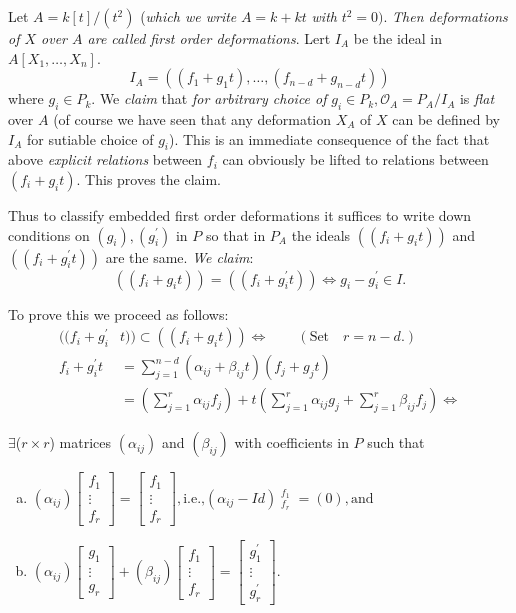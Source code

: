 {Let $A=k[t]/(t^{2})$ ({\em which we write} $A=k+kt$ {\em with}
$t^{2}=0)$. {\em Then deformations of $X$ over $A$ are called first
order deformations}. Lert $I_A$ be the ideal in $A[X_1,\ldots,X_n]$. 
$$
I_A=((f_1+g_1t),\ldots,(f_{n-d}+g_{n-d}t))
$$
where $g_i\in P_k$. We {\em claim} that {\em for arbitrary choice of}
$g_i \in P_k, \mathscr{O}_A=P_A/I_A$ is {\em flat} over $A$ (of course
we have seen that any deformation $X_A$ of $X$ can be defined by $I_A$
for sutiable choice of $g_i$). This is an immediate consequence of the
fact that above {\em explicit relations} between $f_i$ can obviously
be lifted to relations between $(f_i+g_it)$. This proves the claim. 

Thus to classify embedded first order deformations it suffices to
write down conditions on $(g_i), (g^{'}_i)$ in $P$ so that in $P_A$
the ideals $((f_i+g_it))$ and $((f_i+g^{'}_it))$ are the same. {\em We
claim}: 
$$
((f_i+g_it))=((f_i+g_i^{'}t))\Leftrightarrow g_i-g_i^{'}\in I.
$$

To prove this we proceed as follows:
\begin{align*}
((f_i+g^{'}_i&t))\subset((f_i+g_it))\Leftrightarrow\qquad(\text{Set}\quad r=n-d.)\\
f_i+g^{'}_it&=\sum\limits_{j=1}^{n-d}(\alpha_{ij}+\beta_{ij}t)(f_j+g_jt)\\
   &=\left(\sum\limits_{j=1}^{r}\alpha_{ij}f_{j}\right)+t\left(\sum\limits_{j=1}^{r}\alpha_{ij}g_j+\sum\limits_{j=1}^{r}\beta_{ij}f_{j}\right)\Leftrightarrow
\end{align*} 

$\exists$\pageoriginale ($r\times r$) matrices $(\alpha_{ij})$ and $(\beta_{ij})$ with coefficients in $P$ such that
\begin{enumerate}[(a)]
\item $(\alpha_{ij}) \begin{bmatrix}
f_{1}\\
\vdots\\
f_{r}
\end{bmatrix}=\begin{bmatrix}
f_1\\
\vdots\\
f_r
\end{bmatrix}, \text{i.e.,}(\alpha_{ij}-Id)\displaystyle\mathop{(\vdots)}^{f_1}_{f_r}=(0),\text{and}
$
\item $(\alpha_{ij})\begin{bmatrix}
g_1\\
\vdots\\
g_r
\end{bmatrix}+(\beta_{ij})\begin{bmatrix}
f_1\\
\vdots\\
f_r
\end{bmatrix}=\begin{bmatrix}
g_{1}^{'}\\
\vdots\\
g_{r}^{'}
\end{bmatrix}$.
\end{enumerate}

}
